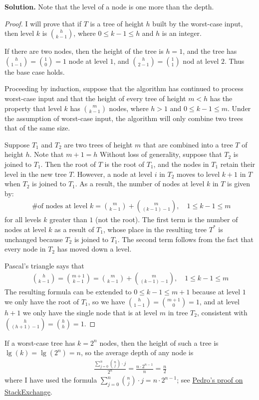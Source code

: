 \documentclass[12pt, a4paper]{article}
\newenvironment{sol}[1][Solution]
{\par\medskip\noindent \textbf{#1.} }
{\medskip}
\begin{document}
	\begin{sol}
		Note that the level of a node is one more than the depth.
		
		\begin{proof}
			I will prove that if $T$ is a tree of height $h$ built by the worst-case input,
			then level $k$ is $\binom{h}{k-1}$, where $0\leq k-1\leq h$ and $h$ is an integer.
			
			If there are two nodes, then the height of the tree is $h=1$, 
			and the tree has $\binom{h}{1-1}=\binom{1}{0}=1$ node at level $1$, and
			$\binom{h}{2-1}=\binom{1}{1}$ nod at level $2$. Thus the base case holds.
			
			Proceeding by induction, suppose that the algorithm has continued to process
			worst-case input and that the height of every tree of height $m < h$
			has the property that level $k$ has $\binom{m}{k-1}$ nodes, where $h>1$
			and $0\leq k-1\leq m$. Under the assumption of worst-case input, the algorithm
			will only combine two trees that of the same size.
			
			Suppose $T_1$ and $T_2$ are two trees of height $m$ that are combined into a tree
			$T$ of height $h$. Note that $m + 1=h$
			Without loss of generality, suppose that $T_2$ is joined to $T_1$.
			Then the root of $T$ is the root of $T_1$, and the nodes in $T_1$ retain
			their level in the new tree $T$. However, a node at level $i$ in $T_2$
			moves to level $k+1$ in $T$ when $T_2$ is joined to $T_1$. As a result,
			the number of nodes at level $k$ in $T$ is given by:
			\begin{align*}
				\text{ \# of nodes at level $k$} = \binom{m}{k-1} + \binom{m}{(k-1) -1},\quad 1\leq k-1\leq m
			\end{align*}
			for all levels $k$ greater than $1$ (not the root). The first term is
			the number of nodes at level $k$ as a result of $T_1$, whose place in the
			resulting tree $T^*$ is unchanged because $T_2$ is joined to $T_1$.
			The second term follows from the fact that every node in $T_2$ has moved
			down a level.
			
			Pascal's triangle says that
			\begin{align*}
				\binom{h}{k-1}=\binom{m+1}{k-1} = \binom{m}{k-1}+\binom{m}{(k-1)-1},\quad 1\leq k-1\leq m
			\end{align*}
			The resulting formula can be extended to $0\leq k-1\leq m+1$ because at level
			$1$ we only have the root of $T_1$, so we have $\binom{h}{1-1}=\binom{m+1}{0}=1$,
			and at level $h+1$ we only have the single node that is at level $m$ in tree $T_2$,
			consistent with $\binom{h}{(h+1)-1}=\binom{h}{h}=1$.
		\end{proof}
		
		If a worst-case tree has $k=2^n$ nodes, then the height of such a tree is $\lg(k)=\lg(2^n)=n$,
		so the average depth of any node is
		\begin{align*}
			\frac{\sum_{j=0}^{n}\binom{n}{j}\cdot j}{2^n} = \frac{n\cdot 2^{n-1}}{n}=\frac{n}{2}
		\end{align*}
		where I have used the formula $\sum_{j=0}^{n}\binom{n}{j}\cdot j=n\cdot 2^{n-1}$;
		see \href{https://math.stackexchange.com/a/123665}{Pedro's proof on StackExchange}.
	\end{sol}
	\pagebreak
	\printbibliography
\end{document}
